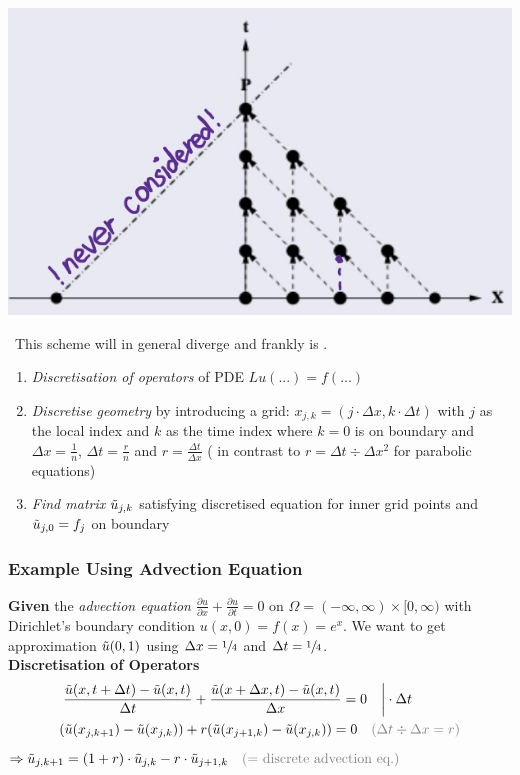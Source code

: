 
\includegraphics[width=0.3\columnwidth]{images/downwind_scheme}

{\color{orange}\faWarning\ This scheme will in general diverge and frankly is \faTrash.}

\begin{enumerate}
	\item \emph{Discretisation of operators} of PDE $Lu(...)=f(...)$
	\item{
		\emph{Discretise geometry} by introducing a grid:
		$x_{j,k} = (j\cdot\Delta x, k\cdot\Delta t)$ with $j$ as the local index
		and $k$ as the time index where $k=0$ is on boundary
		and \colorbox{shadecolor}{$\Delta x = \frac{1}{n}$},
		\colorbox{shadecolor}{$\Delta t = \frac{r}{n}$}
		and \colorbox{shadecolor}{$r = \frac{\Delta t}{\Delta x}$}
		({\color{orange}\faWarning} in contrast to $r=\Delta t\div\Delta x^2$ for parabolic equations)
	}
	\item{
		\emph{Find matrix $\tilde{u}_{j,k}$} satisfying discretised equation for inner grid points
		and $\tilde{u}_{j,0}=f_j$ on boundary
	}
\end{enumerate}

\subsubsection{Example Using Advection Equation}

\textbf{Given} the \emph{advection equation
$\frac{\partial u}{\partial x} + \frac{\partial u}{\partial t} = 0$} on
$\Omega = (-\infty,\infty)\times[0,\infty)$ with Dirichlet's boundary condition
$u(x,0) = f(x) = e^x$. We want to get approximation $\tilde{u}(0,1)$ using
$\Delta x = \sfrac{1}{4}$ and $\Delta t = \sfrac{1}{4}$.
\\[1em]
\textbf{Discretisation of Operators}
\begin{align*}
	& \left.{\frac{\utild(x,t+\Delta t)-\utild(x,t)}{\Delta t}}
	+ {\frac{\utild(x+\Delta x,t)-\utild(x,t)}{\Delta x}} = 0\quad\right|\cdot \Delta t \\
	& (\utild(x_{j,k+1})-\utild(x_{j,k}))+r(\utild(x_{j+1,k})-\utild(x_{j,k}))=0
	{\color{gray} \quad(\Delta t\div\Delta x = r)}
\end{align*}
\colorbox{shadecolor}{$
	\displaystyle
	\Rightarrow \utild_{j,k+1}
	= \left(1+r\right)\cdot\utild_{j,k}-r\cdot\utild_{j+1,k}
	{\color{gray}\quad\text{(= discrete advection eq.)}}
$}

